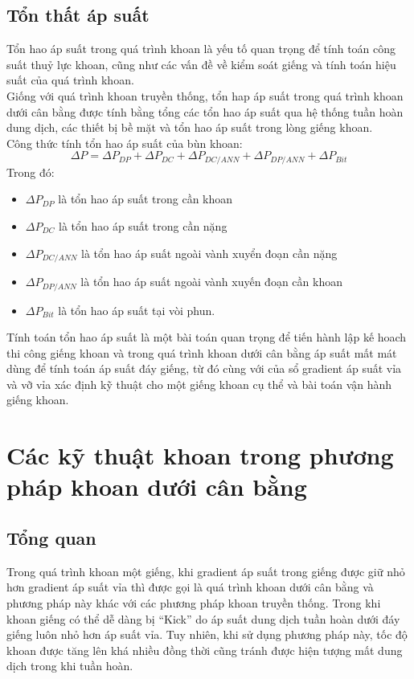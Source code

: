 \documentclass[12pt,a4paper]{article}
\begin{document}
\subsection{Tổn thất áp suất}

Tổn hao áp suất trong quá trình khoan là yếu tố quan trọng để tính toán công suất thuỷ lực khoan, cũng như các vấn đề về kiểm soát giếng và tính toán hiệu suất của quá trình khoan.
\\
Giống với quá trình khoan truyền thống, tổn hap áp suất trong quá trình khoan dưới cân bằng được tính bằng tổng các tổn hao áp suất qua hệ thống tuần hoàn dung dịch, các thiết bị bề mặt và tổn hao áp suất trong lòng giếng khoan.
\\
Công thức tính tổn hao áp suất của bùn khoan\cite{aadnoy2011fundamentals}:
\begin{equation}
\Delta P = \Delta P_{DP}+ \Delta P_{DC}+\Delta P_{DC/ANN}+ \Delta P_{DP/ANN} +\Delta P_{Bit}
\end{equation}
Trong đó:
\begin{itemize}
	\item $\Delta P_{DP}$ là tổn hao áp suất trong cần khoan
	\item $\Delta P_{DC}$ là tổn hao áp suất trong cần nặng
	\item $\Delta P_{DC/ANN}$ là tổn hao áp suất ngoài vành xuyển đoạn cần nặng
	\item $\Delta P_{DP/ANN}$ là tổn hao áp suất ngoài vành xuyến đoạn cần khoan
	\item $\Delta P_{Bit}$ là tổn hao áp suất tại vòi phun.
\end{itemize}
Tính toán tổn hao áp suất là một bài toán quan trọng để tiến hành lập kế hoach thi công giếng khoan và trong quá trình khoan dưới cân bằng áp suất mất mát dùng để tính toán áp suất đáy giếng, từ đó cùng với của sổ gradient áp suất vỉa và vỡ vỉa xác định kỹ thuật cho một giếng khoan cụ thể và bài toán vận hành giếng khoan.
\section{Các kỹ thuật khoan trong phương pháp khoan dưới cân bằng}
\subsection{Tổng quan}
	Trong quá trình khoan một giếng, khi gradient áp suất trong giếng được giữ nhỏ hơn gradient áp suất vỉa thì được gọi là quá trình khoan dưới cân bằng và phương pháp này khác với các phương pháp khoan truyền thống. Trong khi khoan giếng có thể dễ dàng bị ``Kick'' do áp suất dung dịch tuần hoàn dưới đáy giếng luôn nhỏ hơn áp suất vỉa. Tuy nhiên, khi sử dụng phương pháp này, tốc độ khoan được tăng lên khá nhiều đồng thời cũng tránh được hiện tượng mất dung dịch trong khi tuần hoàn. 
\end{document}
